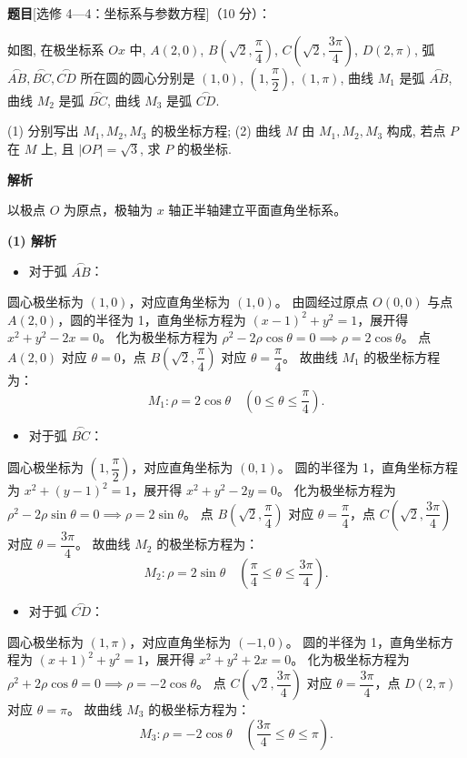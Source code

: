 \begin{answer}

\textbf{题目}[选修 4—4：坐标系与参数方程]（10 分）：

如图, 在极坐标系 $Ox$ 中, $A(2, 0)$, $B\left(\sqrt{2}, \dfrac{\pi}{4}\right)$, $C\left(\sqrt{2}, \dfrac{3\pi}{4}\right)$, $D(2, \pi)$, 弧 $\overset{\frown}{AB}, \overset{\frown}{BC}, \overset{\frown}{CD}$ 所在圆的圆心分别是 $(1, 0)$, $\left(1, \dfrac{\pi}{2}\right)$, $(1, \pi)$, 曲线 $M_1$ 是弧 $\overset{\frown}{AB}$, 曲线 $M_2$ 是弧 $\overset{\frown}{BC}$, 曲线 $M_3$ 是弧 $\overset{\frown}{CD}$.
\nopagebreak[4]
\begin{center}\end{center}
\nopagebreak[4]
(1) 分别写出 $M_1, M_2, M_3$ 的极坐标方程;  
(2) 曲线 $M$ 由 $M_1, M_2, M_3$ 构成, 若点 $P$ 在 $M$ 上, 且 $|OP| = \sqrt{3}$, 求 $P$ 的极坐标.

\textbf{解析}

以极点 $O$ 为原点，极轴为 $x$ 轴正半轴建立平面直角坐标系。

\textbf{(1) 解析}
\begin{itemize}
\item 对于弧 $\overset{\frown}{AB}$：
\end{itemize}
  圆心极坐标为 $(1, 0)$，对应直角坐标为 $(1, 0)$。
  由圆经过原点 $O(0, 0)$ 与点 $A(2, 0)$，圆的半径为 1，直角坐标方程为 $(x - 1)^2 + y^2 = 1$，展开得 $x^2 + y^2 - 2x = 0$。
  化为极坐标方程为 $\rho^2 - 2\rho\cos\theta = 0 \implies \rho = 2\cos\theta$。
  点 $A(2, 0)$ 对应 $\theta = 0$，点 $B\left(\sqrt{2}, \dfrac{\pi}{4}\right)$ 对应 $\theta = \dfrac{\pi}{4}$。
  故曲线 $M_1$ 的极坐标方程为：
\nopagebreak[4]
\[M_1: \rho = 2\cos\theta \quad \left(0 \leqslant \theta \leqslant \frac{\pi}{4}\right).\]
\begin{itemize}
\item 对于弧 $\overset{\frown}{BC}$：
\end{itemize}
  圆心极坐标为 $\left(1, \dfrac{\pi}{2}\right)$，对应直角坐标为 $(0, 1)$。
  圆的半径为 1，直角坐标方程为 $x^2 + (y - 1)^2 = 1$，展开得 $x^2 + y^2 - 2y = 0$。
  化为极坐标方程为 $\rho^2 - 2\rho\sin\theta = 0 \implies \rho = 2\sin\theta$。
  点 $B\left(\sqrt{2}, \dfrac{\pi}{4}\right)$ 对应 $\theta = \dfrac{\pi}{4}$，点 $C\left(\sqrt{2}, \dfrac{3\pi}{4}\right)$ 对应 $\theta = \dfrac{3\pi}{4}$。
  故曲线 $M_2$ 的极坐标方程为：
\nopagebreak[4]
\[M_2: \rho = 2\sin\theta \quad \left(\frac{\pi}{4} \leqslant \theta \leqslant \frac{3\pi}{4}\right).\]
\begin{itemize}
\item 对于弧 $\overset{\frown}{CD}$：
\end{itemize}
  圆心极坐标为 $(1, \pi)$，对应直角坐标为 $(-1, 0)$。
  圆的半径为 1，直角坐标方程为 $(x + 1)^2 + y^2 = 1$，展开得 $x^2 + y^2 + 2x = 0$。
  化为极坐标方程为 $\rho^2 + 2\rho\cos\theta = 0 \implies \rho = -2\cos\theta$。
  点 $C\left(\sqrt{2}, \dfrac{3\pi}{4}\right)$ 对应 $\theta = \dfrac{3\pi}{4}$，点 $D(2, \pi)$ 对应 $\theta = \pi$。
  故曲线 $M_3$ 的极坐标方程为：
\nopagebreak[4]
\[M_3: \rho = -2\cos\theta \quad \left(\frac{3\pi}{4} \leqslant \theta \leqslant \pi\right).\]


\end{answer}
